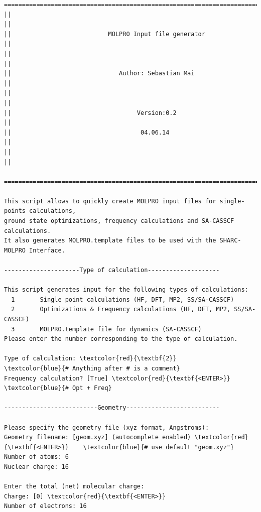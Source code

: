 \documentclass[a4paper,11pt,DIV=15,openany]{scrbook}
\begin{document}
\begin{oframed}
\footnotesize\begin{Verbatim}[commandchars=\\\{\}]
  ================================================================================
||                                                                                ||
||                           MOLPRO Input file generator                          ||
||                                                                                ||
||                              Author: Sebastian Mai                             ||
||                                                                                ||
||                                   Version:0.2                                  ||
||                                    04.06.14                                    ||
||                                                                                ||
  ================================================================================

This script allows to quickly create MOLPRO input files for single-points calculations,
ground state optimizations, frequency calculations and SA-CASSCF calculations. 
It also generates MOLPRO.template files to be used with the SHARC-MOLPRO Interface.
  
---------------------Type of calculation--------------------

This script generates input for the following types of calculations:
  1       Single point calculations (HF, DFT, MP2, SS/SA-CASSCF)
  2       Optimizations & Frequency calculations (HF, DFT, MP2, SS/SA-CASSCF)
  3       MOLPRO.template file for dynamics (SA-CASSCF)
Please enter the number corresponding to the type of calculation.

Type of calculation: \textcolor{red}{\textbf{2}}                       \textcolor{blue}{# Anything after # is a comment}
Frequency calculation? [True] \textcolor{red}{\textbf{<ENTER>}}        \textcolor{blue}{# Opt + Freq}

--------------------------Geometry--------------------------

Please specify the geometry file (xyz format, Angstroms):
Geometry filename: [geom.xyz] (autocomplete enabled) \textcolor{red}{\textbf{<ENTER>}}    \textcolor{blue}{# use default "geom.xyz"}
Number of atoms: 6
Nuclear charge: 16

Enter the total (net) molecular charge:
Charge: [0] \textcolor{red}{\textbf{<ENTER>}}
Number of electrons: 16


\end{Verbatim}
\end{oframed}
\end{document}
